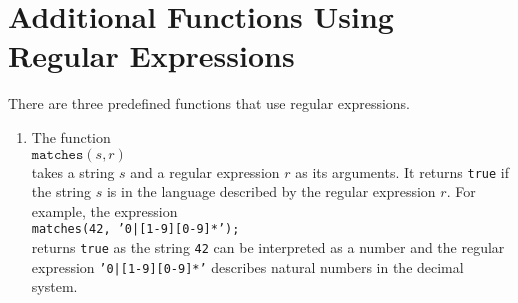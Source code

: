 \section{Additional Functions Using Regular Expressions}
There are three predefined functions that use regular expressions.
\begin{enumerate}
\item The function 
      \\[0.2cm]
      \hspace*{1.3cm}
      $\mathtt{matches}(s, r)$ 
      \\[0.2cm]
      takes a string $s$ and a regular expression $r$ as its arguments.  It returns
      \texttt{true} if the string $s$ is in the language described by the regular
      expression $r$.  For example, the expression
      \\[0.2cm]
      \hspace*{1.3cm}
      \texttt{matches(42, '0|[1-9][0-9]*');}
      \\[0.2cm]
      returns \texttt{true} as the string \texttt{42} can be
      interpreted as a number and the regular expression \texttt{'0|[1-9][0-9]*'}
      describes natural numbers in the decimal system.


\end{enumerate}
